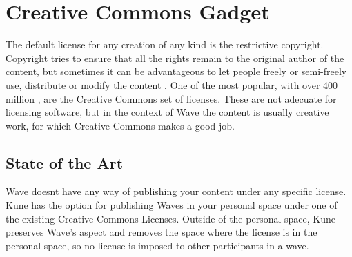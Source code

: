 \section{Creative Commons Gadget}

The default license for any creation of any kind is the restrictive copyright. Copyright tries to ensure that all the rights remain to the original author of the content, but sometimes it can be advantageous to let people freely or semi-freely use, distribute or modify the content \cite{ref:oss_why}. One of the most popular, with over 400 million \cite{ref:the_power_of_open}, are the Creative Commons set of licenses. These are not adecuate for licensing software, but in the context of Wave the content is usually creative work, for which Creative Commons makes a good job.

\label{subsec:cc_soa}
\subsection{State of the Art}
Wave doesnt have any way of publishing your content under any specific license. Kune has the option for publishing Waves in your personal space under one of the existing Creative Commons Licenses. Outside of the personal space, Kune preserves Wave's aspect and removes the space where the license is in the personal space, so no license is imposed to other participants in a wave.

